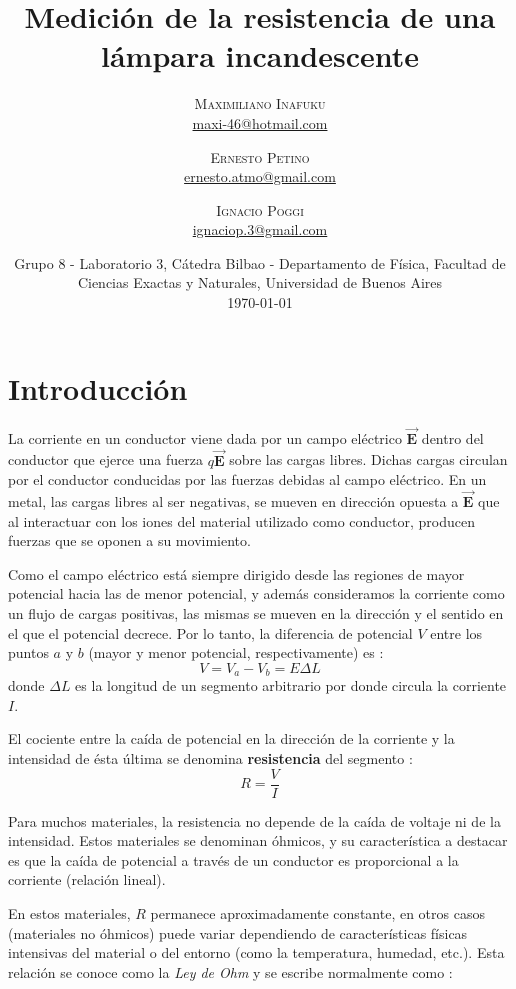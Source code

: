 \documentclass[twoside,twocolumn,a4paper]{article}
\title{Medici\'on de la resistencia de una l\'ampara incandescente} %
\author{%
\textsc{Maximiliano Inafuku} \\[1ex] %
\normalsize \href{mailto:maxi-46@hotmail.com}{maxi-46@hotmail.com} %
\and %
\textsc{Ernesto Petino} \\[1ex] %
\normalsize \href{mailto:ernesto.atmo@gmail.com}{ernesto.atmo@gmail.com} %
\and %
\textsc{Ignacio Poggi} \\[1ex] %
\normalsize \href{mailto:ignaciop.3@gmail.com}{ignaciop.3@gmail.com} %
}
\date{Grupo 8 - Laboratorio 3, C\'atedra Bilbao - Departamento de F\'isica, Facultad de Ciencias Exactas y Naturales, Universidad de Buenos Aires \newline \\ \today} %
\begin{document}
\maketitle


\section{Introducci\'on}

La corriente en un conductor viene dada por un campo el\'ectrico $\mathbf{\vec{E}}$ dentro del conductor que ejerce una fuerza $q\mathbf{\vec{E}}$ sobre las cargas libres. Dichas cargas circulan por el conductor conducidas por las fuerzas debidas al campo el\'ectrico. En un metal, las cargas libres al ser negativas, se mueven en direcci\'on opuesta a $\mathbf{\vec{E}}$ que al interactuar con los iones del material utilizado como conductor, producen fuerzas que se oponen a su movimiento.\par
Como el campo el\'ectrico est\'a siempre dirigido desde las regiones de mayor potencial hacia las de menor potencial, y adem\'as consideramos la corriente como un flujo de cargas positivas, las mismas se mueven en la direcci\'on y el sentido en el que el potencial decrece. Por lo tanto, la diferencia de potencial $V$ entre los puntos $a$ y $b$ (mayor y menor potencial, respectivamente) es \cite{eq:potencial}:
\begin{equation}
\label{eq:potencial}
V = V_{a} - V_{b} = E\Delta L
\end{equation}
donde $\Delta L$ es la longitud de un segmento arbitrario por donde circula la corriente $I$.
\par El cociente entre la ca\'ida de potencial en la direcci\'on de la corriente y la intensidad de \'esta \'ultima se denomina \textbf{resistencia} del segmento \cite{eq:ohm1}:
\begin{equation}
\label{eq:ohm1}
R = \frac{V}{I}
\end{equation}
\par Para muchos materiales, la resistencia no depende de la ca\'ida de voltaje ni de la intensidad. Estos materiales se denominan \'ohmicos, y su caracter\'istica a destacar es que la ca\'ida de potencial a trav\'es de un conductor es proporcional a la corriente (relaci\'on lineal).
\par En estos materiales, $R$ permanece aproximadamente constante, en otros casos (materiales no \'ohmicos) puede variar dependiendo de caracter\'isticas f\'isicas intensivas del material o del entorno (como la temperatura, humedad, etc.). Esta relaci\'on se conoce como la \textit{Ley de Ohm} y se escribe normalmente como \cite{eq:ohm2}:
\end{document}
